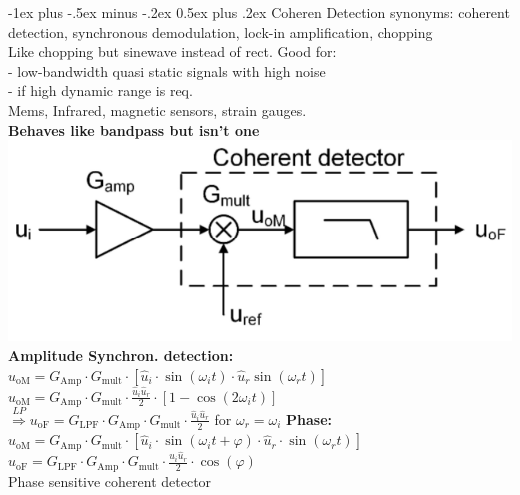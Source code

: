 \documentclass[5pt,landscape]{article}
\makeatletter
\renewcommand{\section}{\@startsection{section}{1}{0mm}%
                                {-1ex plus -.5ex minus -.2ex}%
                                {0.5ex plus .2ex}%
                                {\normalfont\large\bfseries}}
\makeatother
\begin{document}
\begin{multicols*}{5}
\section{Coheren Detection}
synonyms: coherent detection, synchronous demodulation, lock-in amplification, chopping\\
Like chopping but sinewave instead of rect.
Good for:\\
- low-bandwidth quasi static signals with high noise\\
- if high dynamic range is req.\\
Mems, Infrared, magnetic sensors, strain gauges. \\
\textbf{Behaves like bandpass but isn't one}\\
\includegraphics[width=\columnwidth]{images/coherent_setup.png}\\
\textbf{Amplitude Synchron. detection:}\\
$ u_{\mathrm{oM}}=G_{\mathrm{Amp}} \cdot G_{\mathrm{mult}} \cdot\left[\hat{u}_{i} \cdot \sin \left(\omega_{i} t\right) \cdot \hat{u}_{r} \sin \left(\omega_{r} t\right)\right] $\\
$ u_{\mathrm{oM}}=G_{\mathrm{Amp}} \cdot G_{\mathrm{mult}} \cdot \frac{\widehat{u}_{i} \widehat{u}_{r}}{2} \cdot\left[1-\cos \left(2 \omega_{i} t\right)\right] $\\
$ \overset{LP}{\Rightarrow} u_{\mathrm{oF}}=G_{\mathrm{LPF}} \cdot G_{\mathrm{Amp}} \cdot G_{\mathrm{mult}} \cdot \frac{\hat{u}_{i} \hat{u}_{r}}{2} $
for $ \omega_r = \omega_i $
\textbf{Phase:}
$ u_{\mathrm{oM}}=G_{\mathrm{Amp}} \cdot G_{\mathrm{mult}} \cdot\left[\hat{u}_{i} \cdot \sin \left(\omega_{i} t+\varphi\right) \cdot \hat{u}_{r} \cdot \sin \left(\omega_{r} t\right)\right] $\\
$ u_{\mathrm{oF}}=G_{\mathrm{LPF}} \cdot G_{\mathrm{Amp}} \cdot G_{\mathrm{mult}} \cdot \frac{\widehat{u}_{i} \widehat{u}_{r}}{2} \cdot \cos (\varphi) $\\
Phase sensitive coherent detector\\

\end{multicols*}
\end{document}
